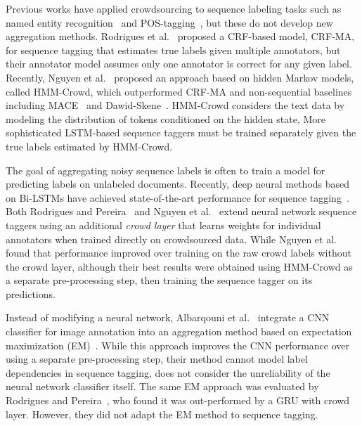 Previous works have applied crowdsourcing to sequence labeling tasks such as named entity recognition~\cite{ritter2011named}
and POS-tagging~\cite{hovy2014experiments}, but these do not develop new aggregation methods.
Rodrigues et al.~ proposed a CRF-based model, CRF-MA,
for sequence tagging that estimates true labels given multiple annotators, 
but their annotator model assumes only one annotator is correct for any given label.
Recently, Nguyen et al.~ proposed an approach 
based on hidden Markov models, called HMM-Crowd, which outperformed CRF-MA and non-sequential baselines including
MACE~\cite{hovy2013learning} and Dawid-Skene~\cite{dawid_maximum_1979}.
HMM-Crowd considers the text data by modeling the distribution of tokens conditioned on the hidden state,
More sophisticated LSTM-based sequence taggers must be trained separately given the true labels estimated by HMM-Crowd.

The goal of aggregating noisy sequence labels is often to train a model for predicting labels on unlabeled documents.
Recently, deep neural methods based on Bi-LSTMs have achieved state-of-the-art performance for 
sequence tagging~\cite{lample2016neural,ma2016end}.
Both Rodrigues and Pereira~ and 
Nguyen et al.~ extend neural network sequence taggers 
using an additional \emph{crowd layer} that learns 
weights for individual annotators when trained directly on crowdsourced data.
While Nguyen et al.~ found that performance improved over training 
on the raw crowd labels without the crowd layer, 
although their best results were obtained using HMM-Crowd as a separate pre-processing step, 
then training the sequence tagger on its predictions.

% 


Instead of modifying a neural network, 
Albarqouni et al.~
integrate a CNN classifier for image annotation
into an aggregation method based on 
expectation maximization (EM)~\cite{dempster_maximum_1977}.
While this approach improves the CNN performance over using a separate pre-processing step, 
their method cannot model label dependencies in sequence tagging, does not consider 
the unreliability of the neural network classifier itself.
The same EM approach was evaluated by Rodrigues and Pereira~,
who found it was out-performed by a GRU with crowd layer. 
However, they did not adapt the EM method to sequence tagging.

